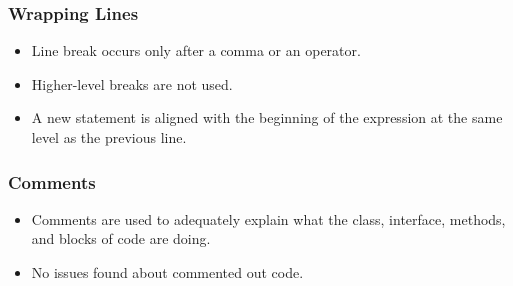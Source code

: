 \subsubsection{Wrapping Lines}
\begin{itemize}
\item Line break occurs only after a comma or an operator. \\
\item Higher-level breaks are not used. \\
\item A new statement is aligned with the beginning of the expression at the
same level as the previous line.\\
\end{itemize}


\subsubsection{Comments}
\begin{itemize}
\item Comments are used to adequately explain what the class, interface,
methods, and blocks of code are doing. \\
\item No issues found about commented out code. \\
\end{itemize}
